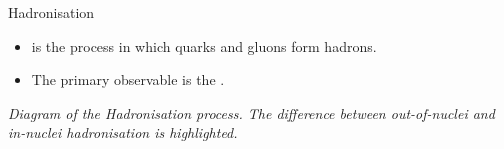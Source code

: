 \begin{frame}{Hadronisation}
    \label{10.13::hadronisation}

    \vspace{12pt}

    \begin{itemize}
        \item
             is the process in which quarks and gluons form hadrons.


        \vspace{12pt}
        \item
            The primary observable is the .
    \end{itemize}

    \vspace{-12pt}

    \begin{center}
        \begin{figure}[t]
        \end{figure}

        \vspace{-12pt}

        \scriptsize{\textit{
            Diagram of the Hadronisation process.
            The difference between out-of-nuclei and in-nuclei hadronisation is highlighted.
        }}
    \end{center}


\end{frame}
